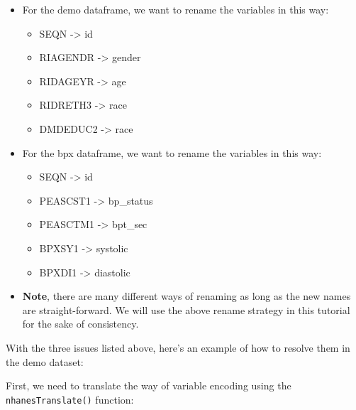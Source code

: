 \documentclass[
]{book}
\providecommand{\tightlist}{%
  \setlength{\itemsep}{0pt}\setlength{\parskip}{0pt}}
\begin{document}
\begin{itemize}
  \begin{itemize}
  \item
    For the demo dataframe, we want to rename the variables in this way:

    \begin{itemize}
    \tightlist
    \item
      SEQN -\textgreater{} id
    \item
      RIAGENDR -\textgreater{} gender
    \item
      RIDAGEYR -\textgreater{} age
    \item
      RIDRETH3 -\textgreater{} race
    \item
      DMDEDUC2 -\textgreater{} race
    \end{itemize}
  \item
    For the bpx dataframe, we want to rename the variables in this way:

    \begin{itemize}
    \tightlist
    \item
      SEQN -\textgreater{} id
    \item
      PEASCST1 -\textgreater{} bp\_status
    \item
      PEASCTM1 -\textgreater{} bpt\_sec
    \item
      BPXSY1 -\textgreater{} systolic
    \item
      BPXDI1 -\textgreater{} diastolic
    \end{itemize}
  \item
    \textbf{Note}, there are many different ways of renaming as long as the new names are straight-forward. We will use the above rename strategy in this tutorial for the sake of consistency.
  \end{itemize}
\end{itemize}

With the three issues listed above, here's an example of how to resolve them in the demo dataset:

First, we need to translate the way of variable encoding using the \texttt{nhanesTranslate()} function:
\end{document}

